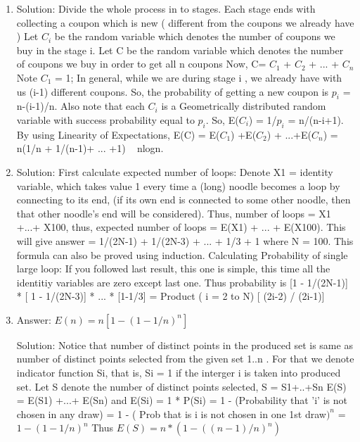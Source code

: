 \begin{enumerate}

\item
Solution: Divide the whole process in to stages. Each stage ends with collecting a coupon which is new ( different from the coupons we already have )
Let $C_i$ be the random variable which denotes the number of coupons we buy in the stage i.
Let C be the random variable which denotes the number of coupons we buy in order to get all n coupons
Now,
C= $C_1$ + $C_2$ + ... + $C_n$
Note $C_1$ = 1;
In general, while we are during stage i , we already have with us (i-1) different coupons. So, the probability of getting a new coupon is $p_i$ = n-(i-1)/n. Also note that each $C_i$ is a Geometrically distributed random variable with success probability equal to $p_i$. So, E($C_i$) = 1/$p_i$ = n/(n-i+1).
By using Linearity of Expectations,
E(C) = E($C_1$) +E($C_2$) + ...+E($C_n$)
= n(1/n + 1/(n-1)+ ... +1)
~ nlogn.




\item
Solution: First calculate expected number of loops:
Denote X1 = identity variable, which takes value 1 every time a (long) noodle becomes a loop by connecting to its end, (if its own end is connected to some other noodle, then that other noodle's end will be considered). Thus, number of loops = X1 +...+ X100, thus, expected number of loops = E(X1) + ... + E(X100). This will give answer = 1/(2N-1) + 1/(2N-3) + ... + 1/3 + 1
where N = 100. This formula can also be proved using induction.
Calculating Probability of single large loop:
If you followed last result, this one is simple, this time all the identitiy variables are zero except last one. Thus probability is [1 - 1/(2N-1)] * [ 1 - 1/(2N-3)] * ... * [1-1/3]
= Product ( i = 2 to N) [ (2i-2) / (2i-1)]




\item
Answer: $E(n) = n[1-(1-1/n)^n]$
 
Solution: Notice that number of distinct points in the produced set is same as number of distinct points selected from the given set {1..n} . For that we denote indicator function Si, that is, Si = 1 if the interger i is taken into produced set.
Let S denote the number of distinct points selected, S = S1+..+Sn
E(S) = E(S1) +...+ E(Sn)
and E(Si) = 1 * P(Si) = 1 - (Probability that 'i' is not chosen in any draw)
= 1 - ( Prob that is i is not chosen in one 1st draw$)^n$ = $1 - (  1 - 1/n )^n$
Thus $E(S) = n * ( 1 - ( (n-1) / n)^n )$




\end{enumerate}
